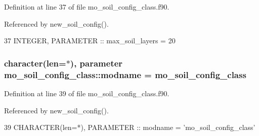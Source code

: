 Definition at line 37 of file mo\+\_\+soil\+\_\+config\+\_\+class.\+f90.



Referenced by new\+\_\+soil\+\_\+config().


\begin{DoxyCode}
37   \textcolor{keywordtype}{INTEGER}, \textcolor{keywordtype}{PARAMETER} :: max\_soil\_layers = 20
\end{DoxyCode}
\hypertarget{namespacemo__soil__config__class_a6b8b4145e195e3615319ed71a4d9d1bb}{}
\subsubsection[{modname}]{\setlength{\rightskip}{0pt plus 5cm}character(len=$\ast$), parameter mo\+\_\+soil\+\_\+config\+\_\+class\+::modname = \textquotesingle{}mo\+\_\+soil\+\_\+config\+\_\+class\textquotesingle{}}\label{namespacemo__soil__config__class_a6b8b4145e195e3615319ed71a4d9d1bb}


Definition at line 39 of file mo\+\_\+soil\+\_\+config\+\_\+class.\+f90.



Referenced by new\+\_\+soil\+\_\+config().


\begin{DoxyCode}
39   \textcolor{keywordtype}{CHARACTER(len=*)}, \textcolor{keywordtype}{PARAMETER} :: modname = \textcolor{stringliteral}{'mo\_soil\_config\_class'}
\end{DoxyCode}
